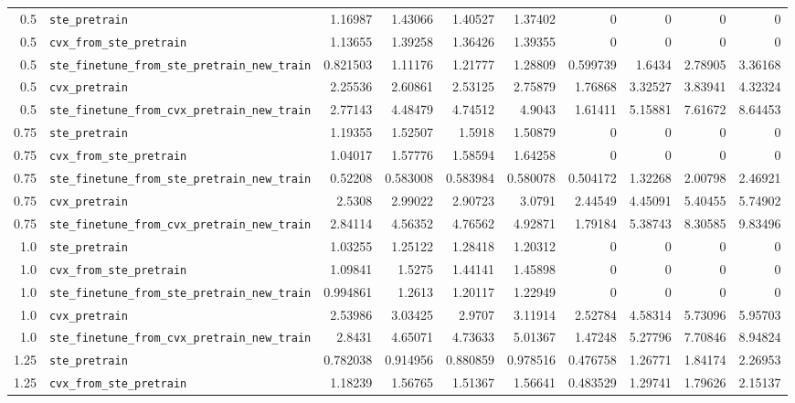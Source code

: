\begin{longtable}{@{}r l *{8}{r}@{}}
0.5 & \texttt{ste\_pretrain} & 1.16987 & 1.43066 & 1.40527 & 1.37402 & 0 & 0 & 0 & 0 \\
0.5 & \texttt{cvx\_from\_ste\_pretrain} & 1.13655 & 1.39258 & 1.36426 & 1.39355 & 0 & 0 & 0 & 0 \\
0.5 & \texttt{ste\_finetune\_from\_ste\_pretrain\_new\_train} & 0.821503 & 1.11176 & 1.21777 & 1.28809 & 0.599739 & 1.6434 & 2.78905 & 3.36168 \\
0.5 & \texttt{cvx\_pretrain} & 2.25536 & 2.60861 & 2.53125 & 2.75879 & 1.76868 & 3.32527 & 3.83941 & 4.32324 \\
0.5 & \texttt{ste\_finetune\_from\_cvx\_pretrain\_new\_train} & 2.77143 & 4.48479 & 4.74512 & 4.9043 & 1.61411 & 5.15881 & 7.61672 & 8.64453 \\
0.75 & \texttt{ste\_pretrain} & 1.19355 & 1.52507 & 1.5918 & 1.50879 & 0 & 0 & 0 & 0 \\
0.75 & \texttt{cvx\_from\_ste\_pretrain} & 1.04017 & 1.57776 & 1.58594 & 1.64258 & 0 & 0 & 0 & 0 \\
0.75 & \texttt{ste\_finetune\_from\_ste\_pretrain\_new\_train} & 0.52208 & 0.583008 & 0.583984 & 0.580078 & 0.504172 & 1.32268 & 2.00798 & 2.46921 \\
0.75 & \texttt{cvx\_pretrain} & 2.5308 & 2.99022 & 2.90723 & 3.0791 & 2.44549 & 4.45091 & 5.40455 & 5.74902 \\
0.75 & \texttt{ste\_finetune\_from\_cvx\_pretrain\_new\_train} & 2.84114 & 4.56352 & 4.76562 & 4.92871 & 1.79184 & 5.38743 & 8.30585 & 9.83496 \\
1.0 & \texttt{ste\_pretrain} & 1.03255 & 1.25122 & 1.28418 & 1.20312 & 0 & 0 & 0 & 0 \\
1.0 & \texttt{cvx\_from\_ste\_pretrain} & 1.09841 & 1.5275 & 1.44141 & 1.45898 & 0 & 0 & 0 & 0 \\
1.0 & \texttt{ste\_finetune\_from\_ste\_pretrain\_new\_train} & 0.994861 & 1.2613 & 1.20117 & 1.22949 & 0 & 0 & 0 & 0 \\
1.0 & \texttt{cvx\_pretrain} & 2.53986 & 3.03425 & 2.9707 & 3.11914 & 2.52784 & 4.58314 & 5.73096 & 5.95703 \\
1.0 & \texttt{ste\_finetune\_from\_cvx\_pretrain\_new\_train} & 2.8431 & 4.65071 & 4.73633 & 5.01367 & 1.47248 & 5.27796 & 7.70846 & 8.94824 \\
1.25 & \texttt{ste\_pretrain} & 0.782038 & 0.914956 & 0.880859 & 0.978516 & 0.476758 & 1.26771 & 1.84174 & 2.26953 \\
1.25 & \texttt{cvx\_from\_ste\_pretrain} & 1.18239 & 1.56765 & 1.51367 & 1.56641 & 0.483529 & 1.29741 & 1.79626 & 2.15137 \\

\end{longtable}
